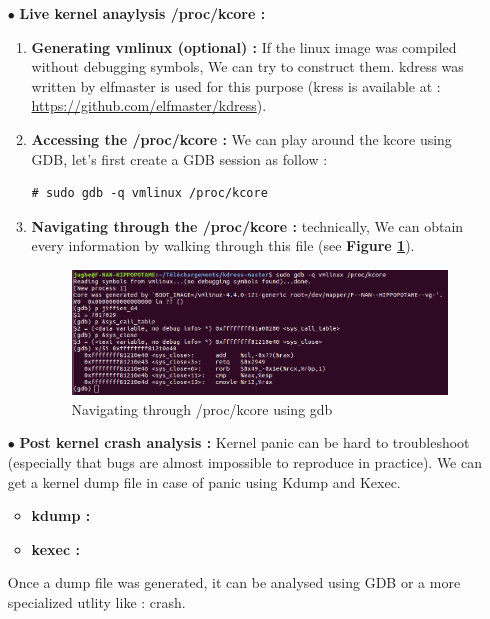 \begin{itemize}
	\item[$\bullet$] \textbf{Live kernel anaylysis /proc/kcore : }
		\begin{enumerate}
			\item \textbf{Generating vmlinux (optional) : } If the linux image was compiled without debugging symbols, We can try to construct them. \og kdress \fg was written by elfmaster is used for this purpose (kress is available at : {\color{blue}\url{https://github.com/elfmaster/kdress}}).
			
			
			\item \textbf{Accessing the /proc/kcore : }  We can play around the kcore using GDB, let's first create a GDB session as follow :
	\begin{lstlisting}[style=BashInputStyle]
# sudo gdb -q vmlinux /proc/kcore
	\end{lstlisting}			

			\item \textbf{Navigating through the /proc/kcore : } technically, We can obtain every information by walking through this file (see \textbf{Figure \ref{Navigating through /proc/kcore using gdb}}).
	
	\begin{figure}[H]
		\centering
        \includegraphics[scale=0.40]{img/solution/gdb-kcore-proc-navigation.png}
        \caption{Navigating through /proc/kcore using gdb}
        \label{Navigating through /proc/kcore using gdb}
    \end{figure}		
				
		\end{enumerate}
	\item[$\bullet$] \textbf{Post kernel crash analysis : } Kernel panic can be hard to troubleshoot (especially that bugs are almost impossible to reproduce in practice). We can get a kernel dump file in case of panic using Kdump and Kexec.
	
\begin{itemize}
	\item \textbf{kdump : }
	\item \textbf{kexec : }
	
\end{itemize}
Once a dump file was generated, it can be analysed using GDB or a more specialized utlity like : crash.
	
\end{itemize}


